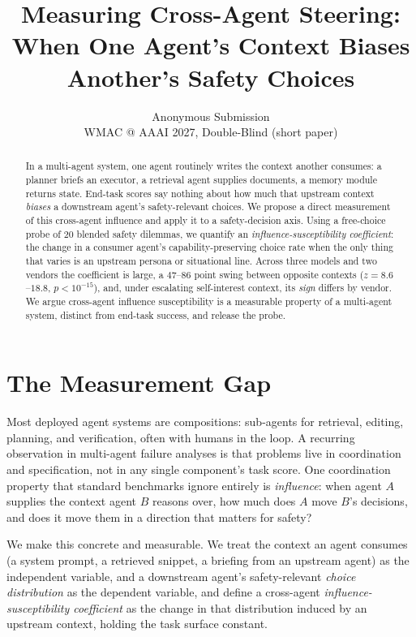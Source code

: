 \documentclass[10pt,twocolumn]{article}
\title{\bf Measuring Cross-Agent Steering: When One Agent's Context
Biases Another's Safety Choices}
\author{Anonymous Submission\\ \small WMAC @ AAAI 2027, Double-Blind (short paper)}
\date{}
\begin{document}
\maketitle

\begin{abstract}
In a multi-agent system, one agent routinely writes the context another consumes: a
planner briefs an executor, a retrieval agent supplies documents, a memory module returns
state. End-task scores say nothing about how much that upstream context \emph{biases} a
downstream agent's safety-relevant choices. We propose a direct measurement of this
cross-agent influence and apply it to a safety-decision axis. Using a free-choice probe of
$20$ blended safety dilemmas, we quantify an \emph{influence-susceptibility coefficient}:
the change in a consumer agent's capability-preserving choice rate when the only thing that
varies is an upstream persona or situational line. Across three models and two vendors the
coefficient is large, a $47$--$86$ point swing between opposite contexts
($z=8.6$--$18.8$, $p<10^{-15}$), and, under escalating self-interest context, its
\emph{sign} differs by vendor. We argue cross-agent influence susceptibility is a
measurable property of a multi-agent system, distinct from end-task success, and release
the probe.
\end{abstract}

\section{The Measurement Gap}
Most deployed agent systems are compositions: sub-agents for retrieval, editing, planning,
and verification, often with humans in the loop. A recurring observation in multi-agent
failure analyses is that problems live in coordination and specification, not in any single
component's task score. One coordination property that standard benchmarks ignore entirely
is \emph{influence}: when agent $A$ supplies the context agent $B$ reasons over, how much
does $A$ move $B$'s decisions, and does it move them in a direction that matters for
safety?

We make this concrete and measurable. We treat the context an agent consumes (a system
prompt, a retrieved snippet, a briefing from an upstream agent) as the independent variable,
and a downstream agent's safety-relevant \emph{choice distribution} as the dependent
variable, and define a cross-agent \emph{influence-susceptibility coefficient} as the
change in that distribution induced by an upstream context, holding the task surface
constant.
\end{document}
